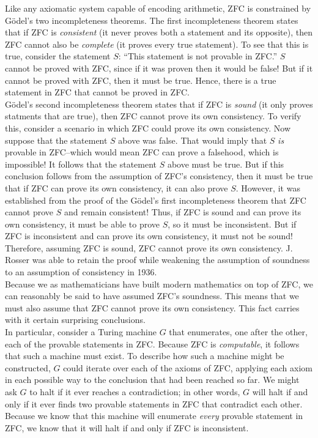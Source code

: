 \documentclass{report}
\begin{document}
Like any axiomatic system capable of encoding arithmetic, ZFC is constrained by G\"{o}del's two incompleteness theorems. The first incompleteness theorem states that if ZFC is \emph{consistent} (it never proves both a statement and its opposite), then ZFC cannot also be \emph{complete} (it proves every true statement). To see that this is true, consider the statement $S$: ``This statement is not provable in ZFC.'' $S$ cannot be proved with ZFC, since if it was proven then it would be false! But if it cannot be proved with ZFC, then it must be true. Hence, there is a true statement in ZFC that cannot be proved in ZFC. \\

G\"{o}del's second incompleteness theorem states that if ZFC is \emph{sound} (it only proves statments that are true), then ZFC cannot prove its own consistency. To verify this, consider a scenario in which ZFC could prove its own consistency. Now suppose that the statement $S$ above was false. That would imply that $S$ \emph{is} provable in ZFC--which would mean ZFC can prove a falsehood, which is impossible! It follows that the statement $S$ above must be true. But if this conclusion follows from the assumption of ZFC's consistency, then it must be true that if ZFC can prove its own consistency, it can also prove $S$. However, it was established from the proof of the G\"{o}del's first incompleteness theorem that ZFC cannot prove $S$ and remain consistent! Thus, if ZFC is sound and can prove its own consistency, it must be able to prove $S$, so it must be inconsistent. But if ZFC is inconsistent and can prove its own consistency, it must not be sound! Therefore, assuming ZFC is sound, ZFC cannot prove its own consistency. J. Rosser was able to retain the proof while weakening the assumption of soundness to an assumption of consistency in 1936. \\ %

Because we as mathematicians have built modern mathematics on top of ZFC, we can reasonably be said to have assumed ZFC's soundness. This means that we must also assume that ZFC cannot prove its own consistency. This fact carries with it certain surprising conclusions. \\

In particular, consider a Turing machine $G$ that enumerates, one after the other, each of the provable statements in ZFC. Because ZFC is \emph{computable}, it follows that such a machine must exist. To describe how such a machine might be constructed, $G$ could iterate over each of the axioms of ZFC, applying each axiom in each possible way to the conclusion that had been reached so far. We might ask $G$ to halt if it ever reaches a contradiction; in other words, $G$ will halt if and only if it ever finds two provable statements in ZFC that contradict each other. Because we know that this machine will enumerate \emph{every} provable statement in ZFC, we know that it will halt if and only if ZFC is inconsistent. \\
\end{document}
